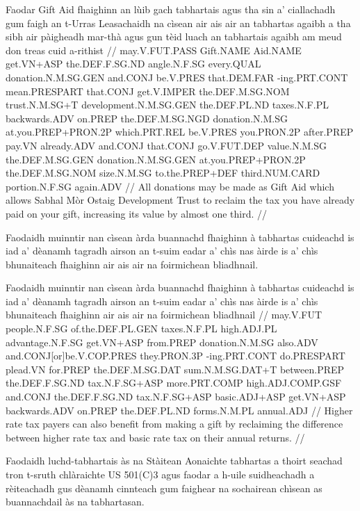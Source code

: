 \documentclass[a4paper,10pt]{article}
\begin{document}
\vspace{4mm}
\gla Faodar Gift Aid fhaighinn an lùib gach tabhartais agus tha sin a' ciallachadh gum faigh an t-Urras Leasachaidh na cìsean {air ais} air an tabhartas agaibh a tha sibh air pàigheadh mar-thà agus gun tèid luach an tabhartais agaibh am meud don treas cuid a-rithist  //
\glb may.V.FUT.PASS Gift.NAME Aid.NAME get.VN+ASP the.DEF.F.SG.ND angle.N.F.SG every.QUAL donation.N.M.SG.GEN and.CONJ be.V.PRES that.DEM.FAR -ing.PRT.CONT mean.PRESPART that.CONJ get.V.IMPER the.DEF.M.SG.NOM trust.N.M.SG+T development.N.M.SG.GEN the.DEF.PL.ND taxes.N.F.PL backwards.ADV on.PREP the.DEF.M.SG.NGD donation.N.M.SG at.you.PREP+PRON.2P which.PRT.REL be.V.PRES you.PRON.2P after.PREP pay.VN already.ADV and.CONJ that.CONJ go.V.FUT.DEP value.N.M.SG the.DEF.M.SG.GEN donation.N.M.SG.GEN at.you.PREP+PRON.2P the.DEF.M.SG.NOM size.N.M.SG to.the.PREP+DEF third.NUM.CARD portion.N.F.SG again.ADV  //
\glft All donations may be made as Gift Aid which allows Sabhal Mòr Ostaig Development Trust to reclaim the tax you have already paid on your gift, increasing its value by almost one third. //
\endgl
\xe

\ex
\begingl
\glpre Faodaidh muinntir nan cìsean àrda buannachd fhaighinn à tabhartas cuideachd is iad a' dèanamh tagradh airson an t-suim eadar a' chìs nas àirde is a' chìs bhunaiteach fhaighinn air ais air na foirmichean bliadhnail. 

\vspace{4mm}
\gla Faodaidh muinntir nan cìsean àrda buannachd fhaighinn à tabhartas cuideachd is iad a' dèanamh tagradh airson an t-suim eadar a' chìs nas àirde is a' chìs bhunaiteach fhaighinn {air ais} air na foirmichean bliadhnail  //
\glb may.V.FUT people.N.F.SG of.the.DEF.PL.GEN taxes.N.F.PL high.ADJ.PL advantage.N.F.SG get.VN+ASP from.PREP donation.N.M.SG also.ADV and.CONJ[or]be.V.COP.PRES they.PRON.3P -ing.PRT.CONT do.PRESPART plead.VN for.PREP the.DEF.M.SG.DAT sum.N.M.SG.DAT+T between.PREP the.DEF.F.SG.ND tax.N.F.SG+ASP more.PRT.COMP high.ADJ.COMP.GSF and.CONJ the.DEF.F.SG.ND tax.N.F.SG+ASP basic.ADJ+ASP get.VN+ASP backwards.ADV on.PREP the.DEF.PL.ND forms.N.M.PL annual.ADJ  //
\glft Higher rate tax payers can also benefit from making a gift by reclaiming the difference between higher rate tax and basic rate tax on their annual returns. //
\endgl
\xe

\ex
\begingl
\glpre Faodaidh luchd-tabhartais às na Stàitean Aonaichte tabhartas a thoirt seachad tron t-sruth chlàraichte US 501(C)3 agus faodar a h-uile suidheachadh a rèiteachadh gus dèanamh cinnteach gum faighear na sochairean chìsean as buannachdail às na tabhartasan. 
\end{document}
